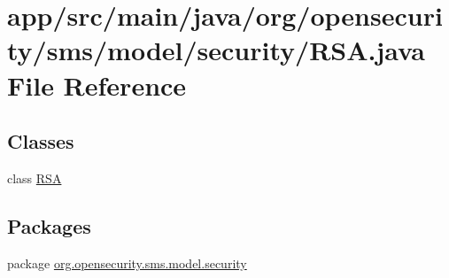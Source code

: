 \hypertarget{a00025}{\section{app/src/main/java/org/opensecurity/sms/model/security/\+R\+S\+A.java File Reference}
\label{a00025}
}
\subsection*{Classes}
\begin{DoxyCompactItemize}
\item 
class \hyperlink{a00013}{R\+S\+A}
\end{DoxyCompactItemize}
\subsection*{Packages}
\begin{DoxyCompactItemize}
\item 
package \hyperlink{a00039}{org.\+opensecurity.\+sms.\+model.\+security}
\end{DoxyCompactItemize}
